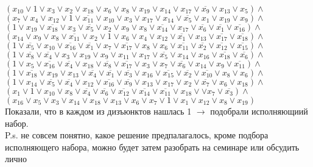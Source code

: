 \documentclass[a4paper,12pt]{article} %
\begin{document}
$(x_{10}\lor 1\lor x_{3}\lor x_{2}\lor x_{18}\lor x_{6}\lor x_{8}\lor x_{19}\lor x_{14}\lor x_{17}\lor \overline{x_{9}}\lor x_{13}\lor x_{5})\land$\\
$(x_{7}\lor x_{4}\lor x_{12}\lor 1\lor \overline{x_{11}}\lor x_{10}\lor x_{3}\lor x_{17}\lor x_{14}\lor \overline{x_{5}}\lor x_{1}\lor x_{19}\lor x_{9})\land$\\
$(1\lor x_{19}\lor \overline{x_{18}}\lor x_{3}\lor \overline{x_{5}}\lor x_{2}\lor x_{9}\lor x_{8}\lor \overline{x_{14}}\lor x_{17}\lor \overline{x_{6}}\lor \overline{x_{1}}\lor \overline{x_{16}})\land$\\
$(x_{14}\lor x_{9}\lor x_{8}\lor \overline{x_{11}}\lor x_{2}\lor 1\lor x_{6}\lor x_{4}\lor x_{12}\lor \overline{x_{1}}\lor x_{13}\lor \overline{x_{17}}\lor \overline{x_{18}})\land$\\
$(1\lor \overline{x_{5}}\lor x_{10}\lor \overline{x_{16}}\lor \overline{x_{1}}\lor x_{7}\lor \overline{x_{17}}\lor x_{8}\lor x_{6}\lor \overline{x_{11}}\lor \overline{x_{2}}\lor \overline{x_{12}}\lor \overline{x_{15}})\land$\\
$(1\lor \overline{x_{8}}\lor \overline{x_{4}}\lor x_{3}\lor x_{19}\lor x_{9}\lor x_{11}\lor x_{17}\lor \overline{x_{5}}\lor x_{14}\lor x_{16}\lor \overline{x_{18}}\lor \overline{x_{6}})\land$\\
$(1\lor x_{5}\lor \overline{x_{16}}\lor \overline{x_{4}}\lor x_{18}\lor \overline{x_{8}}\lor \overline{x_{17}}\lor x_{3}\lor x_{7}\lor \overline{x_{6}}\lor x_{14}\lor x_{9}\lor \overline{x_{11}})\land$\\
$(1\lor \overline{x_{18}}\lor x_{19}\lor x_{13}\lor \overline{x_{4}}\lor \overline{x_{1}}\lor \overline{x_{3}}\lor x_{16}\lor \overline{x_{15}}\lor \overline{x_{2}}\lor \overline{x_{10}}\lor x_{8}\lor x_{6})\land$\\
$(1\lor x_{14}\lor \overline{x_{5}}\lor \overline{x_{4}}\lor x_{12}\lor \overline{x_{16}}\lor \overline{x_{9}}\lor x_{13}\lor x_{17}\lor x_{2}\lor \overline{x_{7}}\lor x_{6}\lor x_{18})\land$\\
$(x_{1}\lor 1\lor x_{10}\lor x_{8}\lor \overline{x_{4}}\lor \overline{x_{6}}\lor \overline{x_{12}}\lor \overline{x_{14}}\lor \overline{x_{11}}\lor x_{18}\lor \lor x_{7}\lor \overline{x_{3}})\land$\\
$(x_{16}\lor x_{5}\lor x_{3}\lor x_{14}\lor x_{18}\lor x_{13}\lor x_{6}\lor x_{7}\lor 1\lor x_{1}\lor x_{12}\lor x_{8}\lor x_{19})$\\ 

Показали, что в каждом из дизъюнктов нашлась 1 $ \longrightarrow $ подобрали исполняющиий набор.\\
P.s. не совсем понятно, какое решение предпалагалось, кроме подбора исполняющего набора, можно будет затем разобрать на семинаре или обсудить лично
\end{document}
